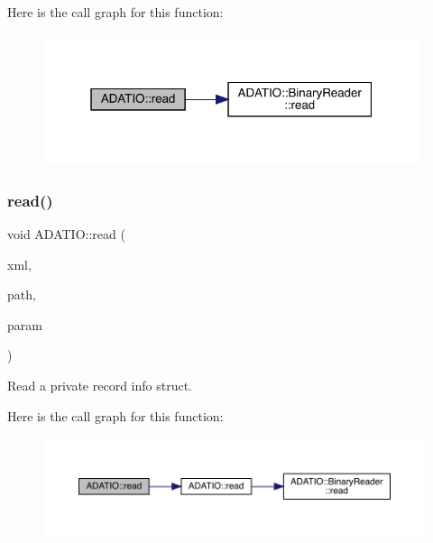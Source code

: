 Here is the call graph for this function\+:
\nopagebreak
\begin{figure}[H]
\begin{center}
\leavevmode
\includegraphics[width=313pt]{d0/dba/namespaceADATIO_a02ebdefcf436220fd6967af8391de2d6_cgraph}
\end{center}
\end{figure}
\mbox{\label{namespaceADATIO_ac5827e268402afb3a0bb4ebbcec97706}} 
\subsubsection{\texorpdfstring{read()}{read()}\hspace{0.1cm}{\footnotesize\ttfamily [10/28]}}
{\footnotesize\ttfamily void A\+D\+A\+T\+I\+O\+::read (\begin{DoxyParamCaption}\item[{\mbox{\hyperlink{classADATXML_1_1XMLReader}{X\+M\+L\+Reader}} \&}]{xml,  }\item[{const std\+::string \&}]{path,  }\item[{\mbox{\hyperlink{structADATIO_1_1QIORecordInfo__t}{Q\+I\+O\+Record\+Info\+\_\+t}} \&}]{param }\end{DoxyParamCaption})}



Read a private record info struct. 

Here is the call graph for this function\+:
\nopagebreak
\begin{figure}[H]
\begin{center}
\leavevmode
\includegraphics[width=350pt]{d0/dba/namespaceADATIO_ac5827e268402afb3a0bb4ebbcec97706_cgraph}
\end{center}
\end{figure}
\mbox{\label{namespaceADATIO_a66f06451ef1705309458a4e2adc71a28}} 
